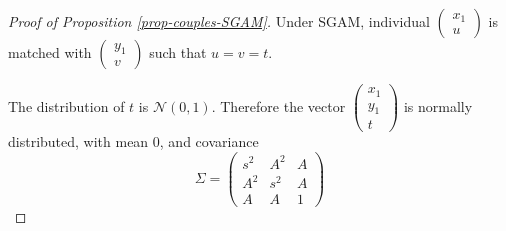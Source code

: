 \documentclass[
  12pt,
]{article}
\theoremstyle{definition}
\theoremstyle{definition}
\theoremstyle{definition}
\theoremstyle{definition}
\theoremstyle{remark}
\begin{document}
\begin{proof}[Proof of Proposition \ref{prop-couples-SGAM}]
Under SGAM, individual $\left( 
\begin{array}{c}
x_{1} \\ 
u
\end{array} 
\right)$ is matched with $\left( 
\begin{array}{c}
y_{1} \\ 
v%
\end{array}%
\right)$ such that $u = v = t$.

The distribution of $t$ is 
$\mathcal{N}\left( 0,1\right)$. Therefore the vector $\left( 
\begin{array}{c}
x_{1} \\ 
y_{1} \\ 
t%
\end{array}%
\right)$ is normally distributed, with mean 0, and covariance
\[
\Sigma =\left( 
\begin{array}{ccc}
s^{2} & A^{2} & A \\ 
A^{2} & s^{2} & A \\ 
A & A & 1
\end{array}%
\right) \allowbreak 
\]


\end{proof}
\end{document}
